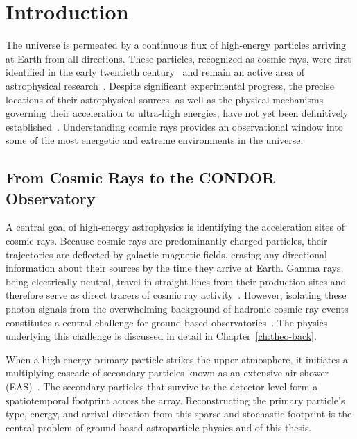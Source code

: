\chapter{Introduction} \label{ch:introduction}

The universe is permeated by a continuous flux of high-energy particles arriving at Earth from all directions. These particles, recognized as cosmic rays, were first identified in the early twentieth century~ and remain an active area of astrophysical research~. Despite significant experimental progress, the precise locations of their astrophysical sources, as well as the physical mechanisms governing their acceleration to ultra-high energies, have not yet been definitively established~. Understanding cosmic rays provides an observational window into some of the most energetic and extreme environments in the universe.

\section{From Cosmic Rays to the CONDOR Observatory}

A central goal of high-energy astrophysics is identifying the acceleration sites of cosmic rays. Because cosmic rays are predominantly charged particles, their trajectories are deflected by galactic magnetic fields, erasing any directional information about their sources by the time they arrive at Earth. Gamma rays, being electrically neutral, travel in straight lines from their production sites and therefore serve as direct tracers of cosmic ray activity~. However, isolating these photon signals from the overwhelming background of hadronic cosmic ray events constitutes a central challenge for ground-based observatories~. The physics underlying this challenge is discussed in detail in Chapter~\ref{ch:theo-back}.

When a high-energy primary particle strikes the upper atmosphere, it initiates a multiplying cascade of secondary particles known as an extensive air shower (EAS)~. The secondary particles that survive to the detector level form a spatiotemporal footprint across the array. Reconstructing the primary particle's type, energy, and arrival direction from this sparse and stochastic footprint is the central problem of ground-based astroparticle physics and of this thesis.

